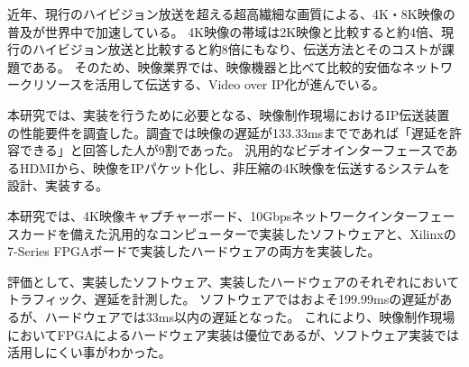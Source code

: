 
\begin{jabstract}

近年、現行のハイビジョン放送を超える超高繊細な画質による、4K・8K映像の普及が世界中で加速している。
4K映像の帯域は2K映像と比較すると約4倍、現行のハイビジョン放送と比較すると約8倍にもなり、伝送方法とそのコストが課題である。
そのため、映像業界では、映像機器と比べて比較的安価なネットワークリソースを活用して伝送する、Video over IP化が進んでいる。

本研究では、実装を行うために必要となる、映像制作現場におけるIP伝送装置の性能要件を調査した。調査では映像の遅延が133.33msまでであれば「遅延を許容できる」と回答した人が9割であった。
汎用的なビデオインターフェースであるHDMIから、映像をIPパケット化し、非圧縮の4K映像を伝送するシステムを設計、実装する。

本研究では、4K映像キャプチャーボード、10Gbpsネットワークインターフェースカードを備えた汎用的なコンピューターで実装したソフトウェアと、Xilinxの7-Series FPGAボードで実装したハードウェアの両方を実装した。

評価として、実装したソフトウェア、実装したハードウェアのそれぞれにおいてトラフィック、遅延を計測した。
ソフトウェアではおよそ199.99msの遅延があるが、ハードウェアでは33ms以内の遅延となった。
これにより、映像制作現場においてFPGAによるハードウェア実装は優位であるが、ソフトウェア実装では活用しにくい事がわかった。

\end{jabstract}


